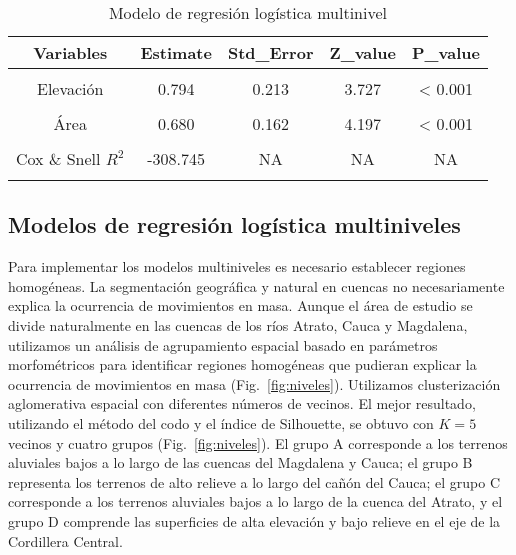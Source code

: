 \documentclass[
  manuscript=article,  
  layout=preprint,  
]{format}
\begin{document}
\begin{table}[!h]
\caption{Modelo de regresión logística multinivel}
\label{tab:m1}
\centering
\begin{tabular}[t]{ccccc}
\toprule
Variables & Estimate & Std\_Error & Z\_value & P\_value\\
\midrule
\cellcolor{gray!6}{(Intercepto)} & \cellcolor{gray!6}{1.762} & \cellcolor{gray!6}{0.173} & \cellcolor{gray!6}{10.164} & \cellcolor{gray!6}{< 0.001}\\
Elevación & 0.794 & 0.213 & 3.727 & < 0.001\\
\cellcolor{gray!6}{Relieve} & \cellcolor{gray!6}{1.242} & \cellcolor{gray!6}{0.214} & \cellcolor{gray!6}{5.802} & \cellcolor{gray!6}{< 0.001}\\
Área & 0.680 & 0.162 & 4.197 & < 0.001\\
\cellcolor{gray!6}{Lluvia anual} & \cellcolor{gray!6}{-0.508} & \cellcolor{gray!6}{0.173} & \cellcolor{gray!6}{-2.935} & \cellcolor{gray!6}{0.00333}\\
\midrule
Cox \& Snell $R^2$ & -308.745 & NA & NA & NA\\
\cellcolor{gray!6}{AIC} & \cellcolor{gray!6}{397.828} & \cellcolor{gray!6}{NA} & \cellcolor{gray!6}{NA} & \cellcolor{gray!6}{NA}\\
\bottomrule
\end{tabular}
\end{table}

\subsection{Modelos de regresión logística multiniveles}

\par Para implementar los modelos multiniveles es necesario establecer regiones homogéneas. La segmentación geográfica y natural en cuencas no necesariamente explica la ocurrencia de movimientos en masa. Aunque el área de estudio se divide naturalmente en las cuencas de los ríos Atrato, Cauca y Magdalena, utilizamos un análisis de agrupamiento espacial basado en parámetros morfométricos para identificar regiones homogéneas que pudieran explicar la ocurrencia de movimientos en masa (Fig.~\ref{fig:niveles}). Utilizamos clusterización aglomerativa espacial con diferentes números de vecinos. El mejor resultado, utilizando el método del codo y el índice de Silhouette, se obtuvo con $K=5$ vecinos y cuatro grupos (Fig.~\ref{fig:niveles}). El grupo A corresponde a los terrenos aluviales bajos a lo largo de las cuencas del Magdalena y Cauca; el grupo B representa los terrenos de alto relieve a lo largo del cañón del Cauca; el grupo C corresponde a los terrenos aluviales bajos a lo largo de la cuenca del Atrato, y el grupo D comprende las superficies de alta elevación y bajo relieve en el eje de la Cordillera Central.
\end{document}
